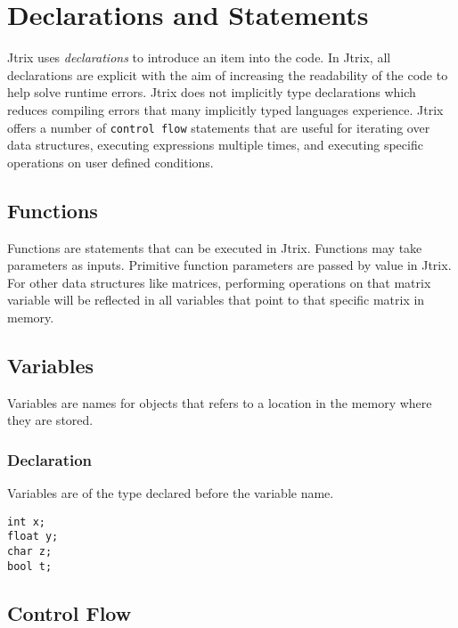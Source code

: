 \documentclass[titlepage, 12pt]{report}
\begin{document}

\chapter{Declarations and Statements}
Jtrix uses \textit{declarations} to introduce an item into the code. In Jtrix, all declarations are explicit with the aim of increasing the readability of the code to help solve runtime errors. Jtrix does not implicitly type declarations which reduces compiling errors that many implicitly typed languages experience. Jtrix offers a number of \texttt{control flow} statements that are useful for iterating over data structures, executing expressions multiple times, and executing specific operations on user defined conditions. 
\section{Functions}
Functions are statements that can be executed in Jtrix. Functions may take parameters as inputs. Primitive function parameters are passed by value in Jtrix. For other data structures like matrices, performing operations on that matrix variable will be reflected in all variables that point to that specific matrix in memory. 
\section{Variables}
Variables are names for objects that refers to a location in the memory where they are stored. 
\subsection{Declaration}
Variables are of the type declared before the variable name. 
\begin{lstlisting}
int x; 
float y; 
char z; 
bool t; 
\end{lstlisting}
\section{Control Flow}
\end{document}
